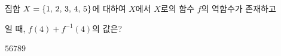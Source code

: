 \hspace*{2mm}\begin{minipage}[t]{\dimexpr\linewidth-2mm\relax}\vspace{0pt}
집합 $X=\{1,\mkern3mu 2,\mkern3mu 3,\mkern3mu 4,\mkern3mu 5\}$에 대하여 $X$에서 $X$로의 함수 $f$의 역함수가 존재하고\par\smallskip{}\par\smallskip\noindent 일 때, $f(4)+f^{-1}(4)$의 값은?
\begin{choices32}{$5$}{$6$}{$7$}{$8$}{$9$}\end{choices32}\end{minipage}
